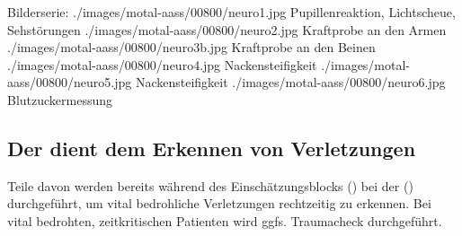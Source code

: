 \begin{PictureSeriesWide}{}{Bilderserie: 
}
{./images/motal-aass/00800/neuro1.jpg}
{Pupillenreaktion, Lichtscheue, Sehstörungen }
{./images/motal-aass/00800/neuro2.jpg}
{Kraftprobe an den Armen}
{./images/motal-aass/00800/neuro3b.jpg}
{Kraftprobe an den Beinen}
{}
{}
{./images/motal-aass/00800/neuro4.jpg}
{Nackensteifigkeit}
{./images/motal-aass/00800/neuro5.jpg}
{Nackensteifigkeit}
{./images/motal-aass/00800/neuro6.jpg}
{Blutzuckermessung}
{}
{}
\end{PictureSeriesWide}



\clearpage %
\subsection{Der  dient dem Erkennen von Verletzungen}
\label{topic:traumacheck}%

\Text{{\TxBeschreibung}}
{
%
Teile davon werden bereits während des Einschätzungsblocks
() 
bei der 
() durchgeführt, 
um vital bedrohliche Verletzungen rechtzeitig zu erkennen.  
Bei vital bedrohten, zeitkritischen Patienten wird
ggfs.  Traumacheck 
durchgeführt. 
}


